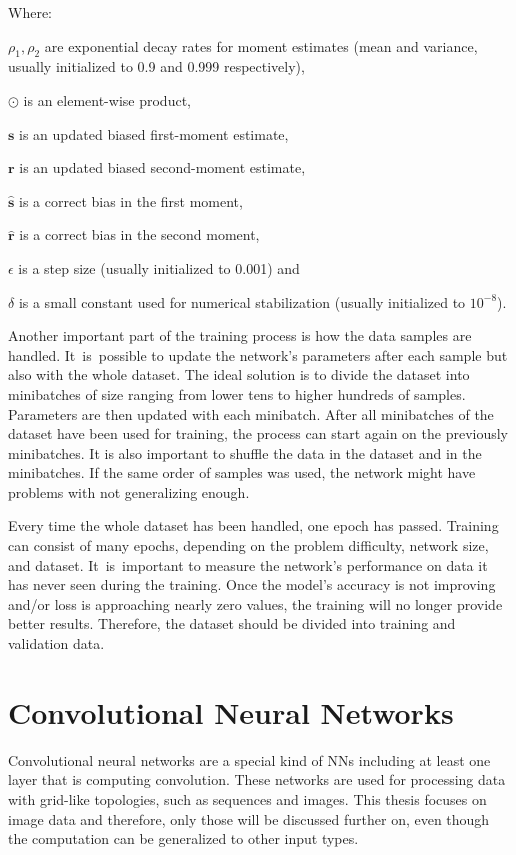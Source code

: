 \noindent Where:

$\rho_1, \rho_2$ are exponential decay rates for moment estimates (mean and variance, usually initialized to 0.9 and 0.999 respectively),

$\odot$ is an element-wise product,

$\pmb s$ is an updated biased first-moment estimate,

$\pmb r$ is an updated biased second-moment estimate,

$\hat{\pmb s}$ is a correct bias in the first moment,

$\hat{\pmb r}$ is a correct bias in the second moment,

$\epsilon$ is a step size (usually initialized to 0.001) and

$\delta$ is a small constant used for numerical stabilization (usually initialized to $10^{-8}$).

\vspace{0.2cm}

Another important part of the training process is how the data samples are handled. It~is~possible to update the network's parameters after each sample but also with the whole dataset. The ideal solution is to divide the dataset into minibatches of size ranging from lower tens to higher hundreds of samples. Parameters are then updated with each minibatch. After all minibatches of the dataset have been used for training, the process can start again on the previously minibatches. It is also important to shuffle the data in the dataset and in the minibatches. If the same order of samples was used, the network might have problems with not generalizing enough.

Every time the whole dataset has been handled, one epoch has passed. Training can consist of many epochs, depending on the problem difficulty, network size, and dataset. It~is~important to measure the network's performance on data it has never seen during the training. Once the model's accuracy is not improving and/or loss is approaching nearly zero values, the training will no longer provide better results. Therefore, the dataset should be divided into training and validation data.

\section{\label{sec:cnn}Convolutional Neural Networks}

Convolutional neural networks are a special kind of NNs including at least one layer that is computing convolution. These networks are used for processing data with grid-like topologies, such as sequences and images. This thesis focuses on image data and therefore, only those will be discussed further on, even though the computation can be generalized to other input types.

